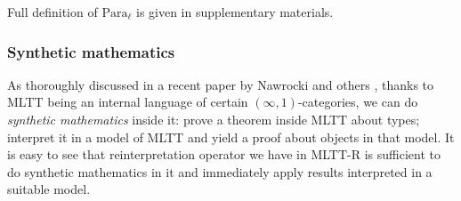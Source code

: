 Full definition of $\mathrm{Para}_\ell$ is given in
supplementary materials.

\subsubsection{Synthetic mathematics}
\label{MLTT-R-synthetic}

As thoroughly discussed in a recent paper by Nawrocki
and others \cite{Nawrocki:Lean2026}, thanks to MLTT
being an internal language of certain
$(\infty,1)$-categories, we can do \textit{synthetic
mathematics} inside it: prove a theorem inside MLTT
about types; interpret it in a model of MLTT and yield
a proof about objects in that model. It is easy to see
that reinterpretation operator we have in MLTT-R is
sufficient to do synthetic mathematics in it and
immediately apply results interpreted in a suitable
model.
